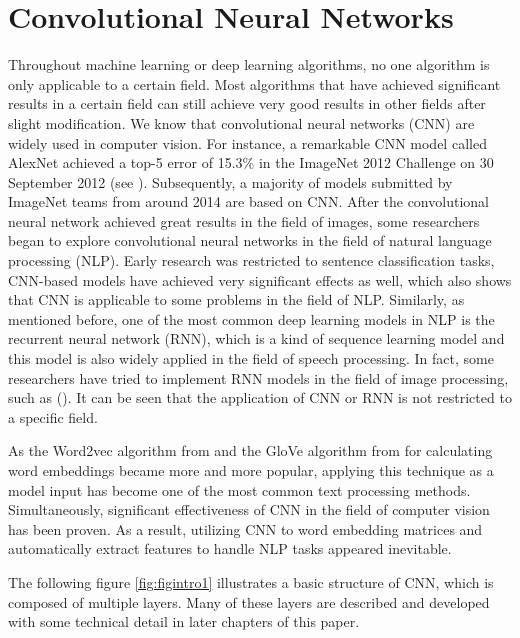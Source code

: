 \documentclass[]{krantz}
\begin{document}
\hypertarget{convolutional-neural-networks}{%
\section{Convolutional Neural Networks}\label{convolutional-neural-networks}}

Throughout machine learning or deep learning algorithms, no one algorithm is only applicable to a certain field. Most algorithms that have achieved significant results in a certain field can still achieve very good results in other fields after slight modification. We know that convolutional neural networks (CNN) are widely used in computer vision. For instance, a remarkable CNN model called AlexNet achieved a top-5 error of 15.3\% in the ImageNet 2012 Challenge on 30 September 2012 (see \citet{Krizhevsky2012ImageNetCW}). Subsequently, a majority of models submitted by ImageNet teams from around 2014 are based on CNN. After the convolutional neural network achieved great results in the field of images, some researchers began to explore convolutional neural networks in the field of natural language processing (NLP). Early research was restricted to sentence classification tasks, CNN-based models have achieved very significant effects as well, which also shows that CNN is applicable to some problems in the field of NLP. Similarly, as mentioned before, one of the most common deep learning models in NLP is the recurrent neural network (RNN), which is a kind of sequence learning model and this model is also widely applied in the field of speech processing. In fact, some researchers have tried to implement RNN models in the field of image processing, such as (\citet{Visin2015ReNetAR}). It can be seen that the application of CNN or RNN is not restricted to a specific field.

As the Word2vec algorithm from \citet{Mikolov.2013c} and the GloVe algorithm from \citet{Pennington.2014} for calculating word embeddings became more and more popular, applying this technique as a model input has become one of the most common text processing methods. Simultaneously, significant effectiveness of CNN in the field of computer vision has been proven. As a result, utilizing CNN to word embedding matrices and automatically extract features to handle NLP tasks appeared inevitable.

The following figure \ref{fig:figintro1} illustrates a basic structure of CNN, which is composed of multiple layers. Many of these layers are described and developed with some technical detail in later chapters of this paper.
\end{document}
